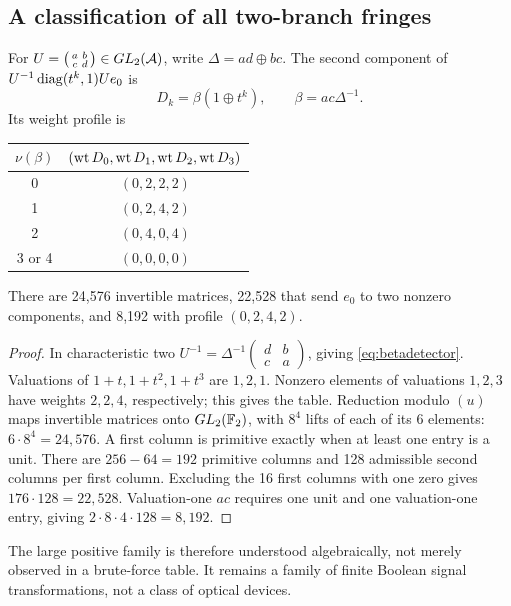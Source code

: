 \subsection{A classification of all two-branch fringes}
\begin{theorem}\label{thm:splitcount}
For $U=\left(\begin{smallmatrix}a&b\\c&d\end{smallmatrix}\right)\in GL_2(\mathcal A)$, write $\Delta=ad\oplus bc$. The second component of $U^{-1}\operatorname{diag}(t^k,1)Ue_0$ is
\begin{equation}\label{eq:betadetector}
 D_k=\beta(1\oplus t^k),\qquad \beta=ac\Delta^{-1}.
\end{equation}
Its weight profile is
\begin{center}\begin{tabular}{@{}cc@{}}\toprule
$\nu(\beta)$ & $(\operatorname{wt} D_0,\operatorname{wt} D_1,\operatorname{wt} D_2,\operatorname{wt} D_3)$\\\midrule
0 & $(0,2,2,2)$\\
1 & $(0,2,4,2)$\\
2 & $(0,4,0,4)$\\
3 or 4 & $(0,0,0,0)$\\\bottomrule
\end{tabular}\end{center}
There are 24,576 invertible matrices, 22,528 that send $e_0$ to two nonzero components, and 8,192 with profile $(0,2,4,2)$.
\end{theorem}
\begin{proof}
In characteristic two $U^{-1}=\Delta^{-1}\left(\begin{smallmatrix}d&b\\c&a\end{smallmatrix}\right)$, giving \cref{eq:betadetector}. Valuations of $1+t,1+t^2,1+t^3$ are $1,2,1$. Nonzero elements of valuations $1,2,3$ have weights $2,2,4$, respectively; this gives the table. Reduction modulo $(u)$ maps invertible matrices onto $GL_2(\mathbb F_2)$, with $8^4$ lifts of each of its 6 elements: $6\cdot8^4=24,576$. A first column is primitive exactly when at least one entry is a unit. There are $256-64=192$ primitive columns and 128 admissible second columns per first column. Excluding the 16 first columns with one zero gives $176\cdot128=22,528$. Valuation-one $ac$ requires one unit and one valuation-one entry, giving $2\cdot8\cdot4\cdot128=8,192$.
\end{proof}
The large positive family is therefore understood algebraically, not merely observed in a brute-force table. It remains a family of finite Boolean signal transformations, not a class of optical devices.


